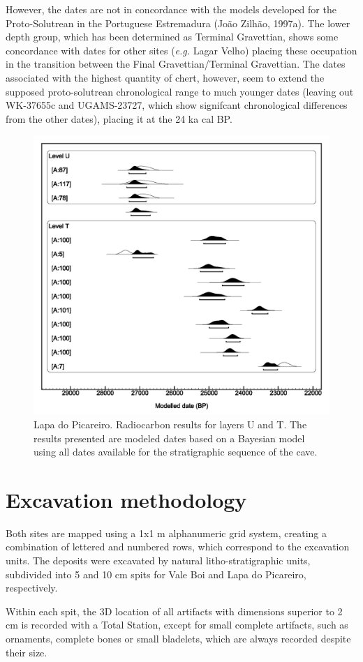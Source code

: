 \documentclass[12pt,twoside]{reedthesis}
\begin{document}
However, the dates are not in concordance with the models developed for the Proto-Solutrean in the Portuguese Estremadura (João Zilhão, 1997a). The lower depth group, which has been determined as Terminal Gravettian, shows some concordance with dates for other sites (\emph{e.g.} Lagar Velho) placing these occupation in the transition between the Final Gravettian/Terminal Gravettian. The dates associated with the highest quantity of chert, however, seem to extend the supposed proto-solutrean chronological range to much younger dates (leaving out WK-37655c and UGAMS-23727, which show signifcant chronological differences from the other dates), placing it at the 24 ka cal BP.
\begin{figure}

{\centering \includegraphics[width=0.6\linewidth]{figure/c14_LP} 

}

\caption{Lapa do Picareiro. Radiocarbon results for layers U and T. The results presented are modeled dates based on a Bayesian model using all dates available for the stratigraphic sequence of the cave.}\label{fig:c14LP}
\end{figure}
\hypertarget{excavation-methodology}{%
\section{Excavation methodology}\label{excavation-methodology}}

Both sites are mapped using a 1x1 m alphanumeric grid system, creating a combination of lettered and numbered rows, which correspond to the excavation units. The deposits were excavated by natural litho-stratigraphic units, subdivided into 5 and 10 cm spits for Vale Boi and Lapa do Picareiro, respectively.

Within each spit, the 3D location of all artifacts with dimensions superior to 2 cm is recorded with a Total Station, except for small complete artifacts, such as ornaments, complete bones or small bladelets, which are always recorded despite their size.
\end{document}
